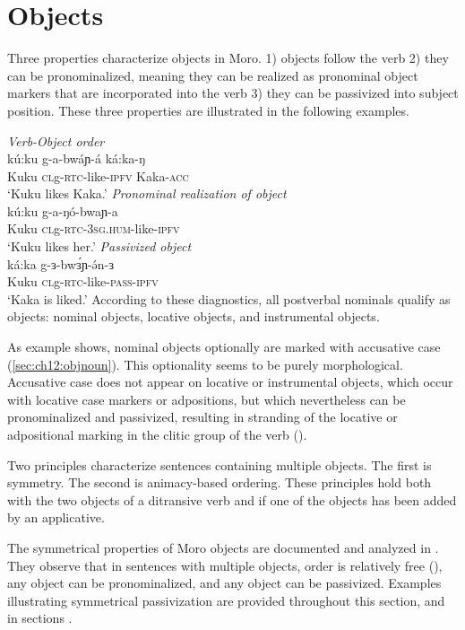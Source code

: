 \section{Objects}\label{sec:ch12:objects}

Three properties characterize objects in Moro. 1) objects follow the verb 2) they can be pronominalized, meaning they can be realized as pronominal object markers that are incorporated into the verb 3) they can be passivized into subject position. These three properties are illustrated in the following examples.

\ea	\textit{Verb-Object order}\\
		\gll	kú:ku	g-a-bwáɲ-á	ká:ka-ŋ \\
				Kuku	\textsc{cl}g-\textsc{rtc}-like-\textsc{ipfv} Kaka-\textsc{acc}\\
		\glt 	`Kuku likes Kaka.' \label{ex:ch12:OVorder}
	\ex	\textit{Pronominal realization of object}\\
		\gll	kú:ku	g-a-ŋó-bwaɲ-a \\
				Kuku	\textsc{cl}g-\textsc{rtc}-\textsc{3sg.hum}-like-\textsc{ipfv}\\
		\glt 	`Kuku likes her.'
	\ex	\textit{Passivized object}\\
		\gll	ká:ka	g-ɜ-bwɜ́ɲ-ə́n-ɜ \\
				Kuku	\textsc{cl}g-\textsc{rtc}-like-\textsc{pass-ipfv}\\
		\glt 	`Kaka is liked.'
\z 
According to these diagnostics, all postverbal nominals qualify as objects: nominal objects, locative objects, and instrumental objects. 

As example  shows, nominal objects optionally are marked with accusative case (\ref{sec:ch12:objnoun}). This optionality seems to be purely morphological. Accusative case does not appear on locative or instrumental objects, which occur with locative case markers or adpositions, but which nevertheless can be pronominalized and passivized, resulting in stranding of the locative or adpositional marking in the clitic group of the verb ().

Two principles characterize sentences containing multiple objects. The first is symmetry. The second is animacy-based ordering. These principles hold both with the two objects of a ditransive verb and if one of the objects has been added by an applicative.

The symmetrical properties of Moro objects are documented and analyzed in \citet{Ackerman:2015}. They observe that in sentences with multiple objects, order is relatively free (), any object can be pronominalized, and any object can be passivized. Examples illustrating symmetrical passivization are provided throughout this section, and in sections .

